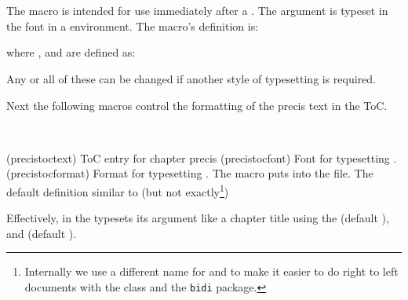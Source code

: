 \begin{syntax}
\cmd{\precisfont} \\
\cmd{\prechapterprecis} \cmd{\postchapterprecis} \\
\end{syntax}
The \cmd{\chapterprecishere} macro is intended for use immediately after
a \cmd{\chapter}. The  argument is typeset in
the \cmd{\precisfont} font in a  environment. The macro's
definition is:
\begin{lcode}
\newcommand{\chapterprecishere}[1]{%
  \prechapterprecis #1\postchapterprecis}
\end{lcode}
where \cmd{\prechapterprecis}, \cmd{\postchapterprecis} and \cmd{\precisfont}
are defined as:
\begin{lcode}
\newcommand{\prechapterprecis}{%
  \vspace*{\prechapterprecisshift}%
  \begin{quote}\precisfont}
\newcommand{\postchapterprecis}{\end{quote}}
\newcommand*{\precisfont}{\normalfont\itshape}
\end{lcode}
Any or all of these can be changed if another style of typesetting is required.

Next the following macros control the formatting of the precis text in
the ToC.
\begin{syntax}
\cmd{\precistoctext} \cmd{\precistocfont} \cmd{\precistocformat} \\
\end{syntax}
\glossary(precistoctext)%
  {}%
  {ToC entry for chapter precis }
\glossary(precistocfont)%
  {}%
  {Font for typesetting .}
\glossary(precistocformat)%
  {}%
  {Format for typesetting .}
The \cmd{\chapterprecistoc} macro puts \cmd{\precistoctext} into
the  file. The default definition similar to (but not
exactly\footnote{Internally we use a different name for 
  and  to make it easier to do right to left documents
with the class and the \texttt{bidi} package.})
\begin{lcode}
\DeclareRobustCommand{\precistoctext}[1]{%
  {\nopagebreak\leftskip \cftchapterindent\relax
    \advance\leftskip \cftchapternumwidth\relax
    \rightskip \@tocrmarg\relax
    \precistocformat\precistocfont #1\par}}
\end{lcode}
Effectively, in the \toc{} \cmd{\precistoctext} typesets its argument like
a chapter title using the \cmd{\precistocfont} (default
\cmd{\itshape}), and \cmd{\precistocformat} (default \cmd{\noindent}).

